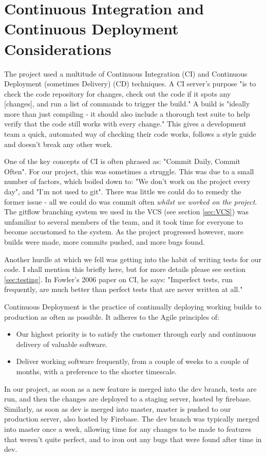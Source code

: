\documentclass{l3proj}
\begin{document}
\section{Continuous Integration and Continuous Deployment Considerations}
\label{sec:cicd}

The project used a multitude of Continuous Integration (CI) and Continuous
 Deployment (sometimes Delivery) (CD) techniques. A CI server's purpose "is to check the code
 repository for changes, check out the code if it spots any [changes], and run a
 list of commands to trigger the build."\cite{meyer2014continuous} A build is "ideally more than just
 compiling - it should also include a thorough test suite to help verify that the code
 still works with every change."\cite{meyer2014continuous} This gives a development
 team a quick, automated way of checking their code works, follows a style guide and
 doesn't break any other work. 
 
One of the key concepts of CI is often phrased as: "Commit Daily, 
 Commit Often"\cite{meyer2014continuous}. For our project, this was sometimes a struggle. 
 This was due to a small number of factors, which boiled down to: "We don't work on the project 
 every day", and "I'm not used to git". There was little we could do to remedy the former issue - 
 all we could do was commit often \textit{whilst we worked on the project}. The gitflow 
 branching system we used in the VCS (see section \ref{sec:VCS}) was unfamiliar to several 
 members of the team, and it took time for everyone to become accustomed to the system. As the
 project progressed however, more builds were made, more commits pushed, and more bugs found.

Another hurdle at which we fell was getting into the habit of writing tests for our code. I shall 
 mention this briefly here, but for more details please see section \ref{sec:testing}. In Fowler's 
 2006 paper on CI, he says: "Imperfect tests, run frequently, are much better than perfect tests 
 that are never written at all."\cite{fowler2006continuous}
 
Continuous Deployment is the practice of continually deploying working builds to production
 as often as possible. It adheres to the Agile principles of:
 \begin{itemize}
 \item
 Our highest priority is to satisfy the customer
 through early and continuous delivery
 of valuable software. \cite{agileprinciples}
 \item 
 Deliver working software frequently, from a 
 couple of weeks to a couple of months, with a 
 preference to the shorter timescale. \cite{agileprinciples}
 \end{itemize}
 In our project, as soon as a new feature is merged into the dev branch,
 tests are run, and then the changes are deployed to a staging server, hosted by firebase. Similarly,
 as soon as dev is merged into master, master is pushed to our production server, also hosted by Firebase.
 The dev branch was typically merged into master once a week, allowing time for any changes to be made 
 to features that weren't quite perfect, and to iron out any bugs that were found after time in dev.
 
\end{document}
